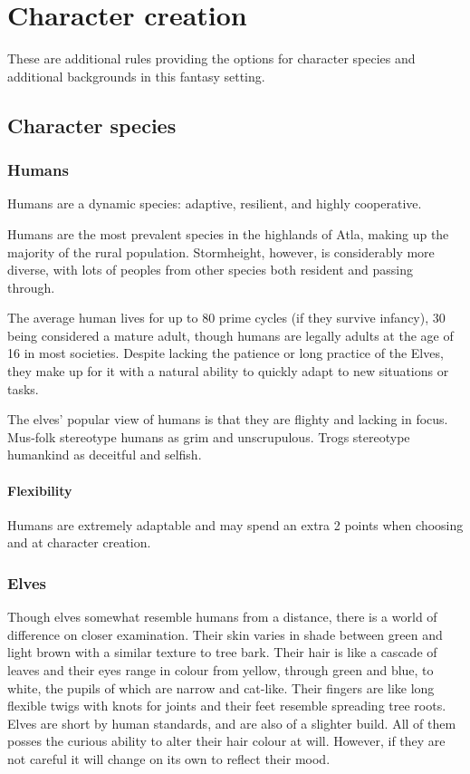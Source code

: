 \documentclass[a4paper,11pt,oneside]{book}
\newcommand{\textlf}[1]{\textbf{\titlecap{#1}}}
\begin{document}
\chapter{Character creation}
These are additional rules providing the options for character species and additional backgrounds in this fantasy setting.

\section{Character species}

\subsection{Humans}
Humans are a dynamic species: adaptive, resilient, and highly cooperative.

Humans are the most prevalent species in the highlands of Atla, making up the majority of the rural population. Stormheight, however, is considerably more diverse, with lots of peoples from other species both resident and passing through.

The average human lives for up to 80 prime cycles (if they survive infancy), 30 being considered a mature adult, though humans are legally adults at the age of 16 in most societies. Despite lacking the patience or long practice of the Elves, they make up for it with a natural ability to quickly adapt to new situations or tasks. 

The elves' popular view of humans is that they are flighty and lacking in focus. Mus-folk stereotype humans as grim and unscrupulous. Trogs stereotype humankind as deceitful and selfish.  

\subsubsection*{Flexibility}
Humans are extremely adaptable and may spend an extra 2 points when choosing \textlf{perks} and \textlf{proficiencies} at character creation.


\subsection{Elves}
Though elves somewhat resemble humans from a distance, there is a world of difference on closer examination. Their skin varies in shade between green and light brown with a similar texture to tree bark. Their hair is like a cascade of leaves and their eyes range in colour from yellow, through green and blue, to white, the pupils of which are narrow and cat-like. Their fingers are like long flexible twigs with knots for joints and their feet resemble spreading tree roots. Elves are short by human standards, and are also of a slighter build. All of them posses the curious ability to alter their hair colour at will. However, if they are not careful it will change on its own to reflect their mood. 
\end{document}
